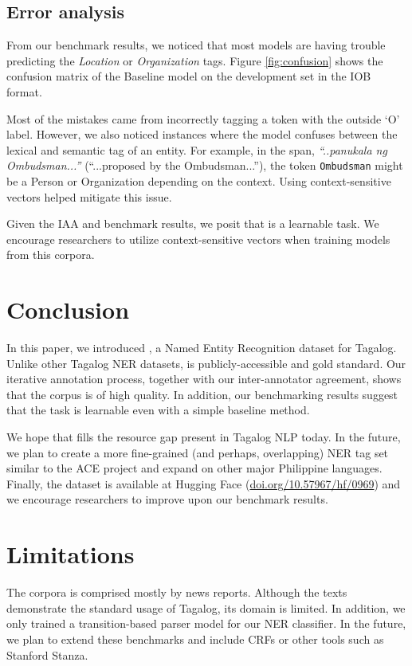 \documentclass[11pt]{article}
\begin{document}
\subsection{Error analysis}

From our benchmark results, we noticed that most models are having trouble predicting the \textit{Location} or \textit{Organization} tags.
Figure \ref{fig:confusion} shows the confusion matrix of the Baseline model on the development set in the IOB format.

Most of the mistakes came from incorrectly tagging a token with the outside `O' label.
However, we also noticed instances where the model confuses between the lexical and semantic tag of an entity.
For example, in the span, \textit{``..panukala ng Ombudsman...''} (``...proposed by the Ombudsman...''), the token \texttt{Ombudsman} might be a Person or Organization depending on the context.
Using context-sensitive vectors helped mitigate this issue.

Given the IAA and benchmark results, we posit that \tlunified{} is a learnable task.
We encourage researchers to utilize context-sensitive vectors when training models from this corpora.


\section{Conclusion}

In this paper, we introduced \tlunified{}, a Named Entity Recognition dataset for Tagalog.
Unlike other Tagalog NER datasets, \tlunified{} is publicly-accessible and gold standard.
Our iterative annotation process, together with our inter-annotator agreement, shows that the corpus is of high quality.
In addition, our benchmarking results suggest that the task is learnable even with a simple baseline method.

We hope that \tlunified{} fills the resource gap present in Tagalog NLP today.
In the future, we plan to create a more fine-grained (and perhaps, overlapping) NER tag set similar to the ACE project and expand on other major Philippine languages.
Finally, the dataset is available at Hugging Face (\url{doi.org/10.57967/hf/0969}) and we encourage researchers to improve upon our benchmark results.


\section*{Limitations}

The \tlunified{} corpora is comprised mostly by news reports.
Although the texts demonstrate the standard usage of Tagalog, its domain is limited.
In addition, we only trained a transition-based parser model for our NER classifier.
In the future, we plan to extend these benchmarks and include CRFs or other tools such as Stanford Stanza.




\end{document}

